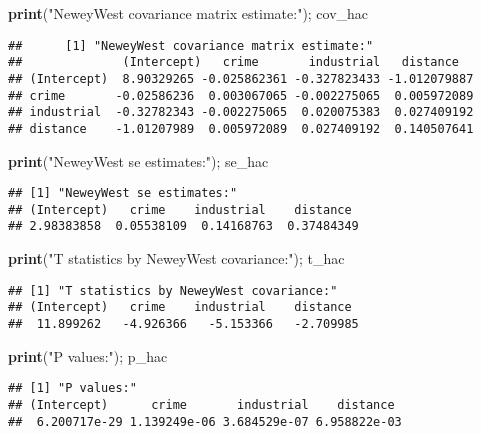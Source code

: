 \documentclass[
  12pt,
]{article}
\newenvironment{Shaded}{\begin{snugshade}}{\end{snugshade}}
\newcommand{\KeywordTok}[1]{\textcolor[rgb]{0.13,0.29,0.53}{\textbf{#1}}}
\newcommand{\NormalTok}[1]{#1}
\newcommand{\StringTok}[1]{\textcolor[rgb]{0.31,0.60,0.02}{#1}}
\begin{document}
\begin{Shaded}
\begin{Highlighting}[]
\KeywordTok{print}\NormalTok{(}\StringTok{"NeweyWest covariance matrix estimate:"}\NormalTok{); cov\_hac}
\end{Highlighting}
\end{Shaded}

\begin{Verbatim}
##      [1] "NeweyWest covariance matrix estimate:"
##              (Intercept)   crime       industrial   distance
## (Intercept)  8.90329265 -0.025862361 -0.327823433 -1.012079887
## crime       -0.02586236  0.003067065 -0.002275065  0.005972089
## industrial  -0.32782343 -0.002275065  0.020075383  0.027409192
## distance    -1.01207989  0.005972089  0.027409192  0.140507641
\end{Verbatim}

\begin{Shaded}
\begin{Highlighting}[]
\KeywordTok{print}\NormalTok{(}\StringTok{"NeweyWest se estimates:"}\NormalTok{); se\_hac}
\end{Highlighting}
\end{Shaded}

\begin{verbatim}
## [1] "NeweyWest se estimates:"
## (Intercept)   crime    industrial    distance 
## 2.98383858  0.05538109  0.14168763  0.37484349 
\end{verbatim}

\begin{Shaded}
\begin{Highlighting}[]
\KeywordTok{print}\NormalTok{(}\StringTok{"T statistics by NeweyWest covariance:"}\NormalTok{); t\_hac}
\end{Highlighting}
\end{Shaded}

\begin{verbatim}
## [1] "T statistics by NeweyWest covariance:"
## (Intercept)   crime    industrial    distance 
##  11.899262   -4.926366   -5.153366   -2.709985 
\end{verbatim}

\begin{Shaded}
\begin{Highlighting}[]
\KeywordTok{print}\NormalTok{(}\StringTok{"P values:"}\NormalTok{); p\_hac}
\end{Highlighting}
\end{Shaded}

\begin{verbatim}
## [1] "P values:"
## (Intercept)      crime       industrial    distance 
##  6.200717e-29 1.139249e-06 3.684529e-07 6.958822e-03 
\end{verbatim}
\end{document}
